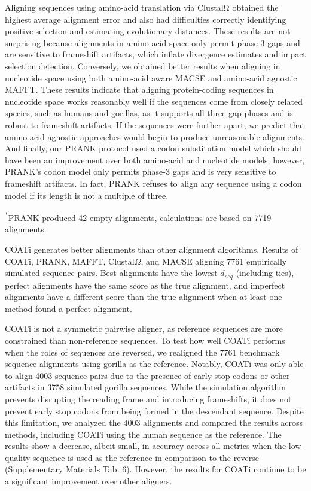 \documentclass[12pt,letterpaper]{article}
\begin{document}
Aligning sequences using amino-acid translation via ClustalΩ obtained the highest average alignment error and also had difficulties correctly identifying positive selection and estimating evolutionary distances. These results are not surprising because alignments in amino-acid space only permit phase-3 gaps and are sensitive to frameshift artifacts, which inflate divergence estimates and impact selection detection. Conversely, we obtained better results when aligning in nucleotide space using both amino-acid aware MACSE and amino-acid agnostic MAFFT. These results indicate that aligning protein-coding sequences in nucleotide space works reasonably well if the sequences come from closely related species, such as humans and gorillas, as it supports all three gap phases and is robust to frameshift artifacts. If the sequences were further apart, we predict that amino-acid agnostic approaches would begin to produce unreasonable alignments. And finally, our PRANK protocol used a codon substitution model which should have been an improvement over both amino-acid and nucleotide models; however, PRANK's codon model only permits phase-3 gaps and is very sensitive to frameshift artifacts. In fact, PRANK refuses to align any sequence using a codon model if its length is not a multiple of three.

\begin{table}[!ht]
\centering

 \vspace{1mm}
 \footnotesize{\textsuperscript{*}PRANK produced 42 empty alignments, calculations are based on 7719 alignments.}
 \caption{COATi generates better alignments than other alignment algorithms. Results of COATi, PRANK, MAFFT, Clustal$\Omega$, and MACSE aligning 7761 empirically simulated sequence pairs. Best alignments have the lowest $d_{seq}$ (including ties), perfect alignments have the same score as the true alignment, and imperfect alignments have a different score than the true alignment when at least one method found a perfect alignment.}
 \label{table:comp}
\end{table}

COATi is not a symmetric pairwise aligner, as reference sequences are more constrained than non-reference sequences. To test how well COATi performs when the roles of sequences are reversed, we realigned the 7761 benchmark sequence alignments using gorilla as the reference. Notably, COATi was only able to align 4003 sequence pairs due to the presence of early stop codons or other artifacts in 3758 simulated gorilla sequences. While the simulation algorithm prevents disrupting the reading frame and introducing frameshifts, it does not prevent early stop codons from being formed in the descendant sequence. Despite this limitation, we analyzed the 4003 alignments and compared the results across methods, including COATi using the human sequence as the reference. The results show a decrease, albeit small, in accuracy across all metrics when the low-quality sequence is used as the reference in comparison to the reverse (Supplementary Materials Tab. 6). However, the results for COATi continue to be a significant improvement over other aligners.
\end{document}

